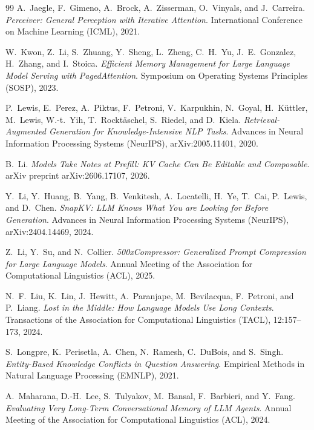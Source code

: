 \documentclass[11pt]{article}
\renewcommand{\_}{\origunderscore\allowbreak}
\begin{document}
\begin{thebibliography}{99}
A.~Jaegle, F.~Gimeno, A.~Brock, A.~Zisserman, O.~Vinyals, and J.~Carreira.
\newblock \textit{Perceiver: General Perception with Iterative Attention}.
\newblock International Conference on Machine Learning (ICML), 2021.

W.~Kwon, Z.~Li, S.~Zhuang, Y.~Sheng, L.~Zheng, C.~H.~Yu, J.~E.~Gonzalez, H.~Zhang, and I.~Stoica.
\newblock \textit{Efficient Memory Management for Large Language Model Serving with PagedAttention}.
\newblock Symposium on Operating Systems Principles (SOSP), 2023.

P.~Lewis, E.~Perez, A.~Piktus, F.~Petroni, V.~Karpukhin, N.~Goyal, H.~K{\"u}ttler, M.~Lewis, W.-t.~Yih, T.~Rockt{\"a}schel, S.~Riedel, and D.~Kiela.
\newblock \textit{Retrieval-Augmented Generation for Knowledge-Intensive NLP Tasks}.
\newblock Advances in Neural Information Processing Systems (NeurIPS), arXiv:2005.11401, 2020.

B.~Li.
\newblock \textit{Models Take Notes at Prefill: KV Cache Can Be Editable and Composable}.
\newblock arXiv preprint arXiv:2606.17107, 2026.

Y.~Li, Y.~Huang, B.~Yang, B.~Venkitesh, A.~Locatelli, H.~Ye, T.~Cai, P.~Lewis, and D.~Chen.
\newblock \textit{SnapKV: LLM Knows What You are Looking for Before Generation}.
\newblock Advances in Neural Information Processing Systems (NeurIPS), arXiv:2404.14469, 2024.

Z.~Li, Y.~Su, and N.~Collier.
\newblock \textit{500xCompressor: Generalized Prompt Compression for Large Language Models}.
\newblock Annual Meeting of the Association for Computational Linguistics (ACL), 2025.

N.~F.~Liu, K.~Lin, J.~Hewitt, A.~Paranjape, M.~Bevilacqua, F.~Petroni, and P.~Liang.
\newblock \textit{Lost in the Middle: How Language Models Use Long Contexts}.
\newblock Transactions of the Association for Computational Linguistics (TACL), 12:157--173, 2024.

S.~Longpre, K.~Perisetla, A.~Chen, N.~Ramesh, C.~DuBois, and S.~Singh.
\newblock \textit{Entity-Based Knowledge Conflicts in Question Answering}.
\newblock Empirical Methods in Natural Language Processing (EMNLP), 2021.

A.~Maharana, D.-H.~Lee, S.~Tulyakov, M.~Bansal, F.~Barbieri, and Y.~Fang.
\newblock \textit{Evaluating Very Long-Term Conversational Memory of LLM Agents}.
\newblock Annual Meeting of the Association for Computational Linguistics (ACL), 2024.


\end{thebibliography}
\end{document}
